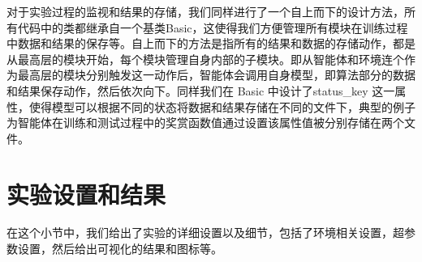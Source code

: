 \documentclass{standalone}
\begin{document}
对于实验过程的监视和结果的存储，我们同样进行了一个自上而下的设计方法，所有代码中的类都继承自一个基类Basic，这使得我们方便管理所有模块在训练过程中数据和结果的保存等。自上而下的方法是指所有的结果和数据的存储动作，都是从最高层的模块开始，每个模块管理自身内部的子模块。即从智能体和环境连个作为最高层的模块分别触发这一动作后，智能体会调用自身模型，即算法部分的数据和结果保存动作，然后依次向下。同样我们在 Basic 中设计了status\_key 这一属性，使得模型可以根据不同的状态将数据和结果存储在不同的文件下，典型的例子为智能体在训练和测试过程中的奖赏函数值通过设置该属性值被分别存储在两个文件。
\section{实验设置和结果}
在这个小节中，我们给出了实验的详细设置以及细节，包括了环境相关设置，超参数设置，然后给出可视化的结果和图标等。
\end{document}

